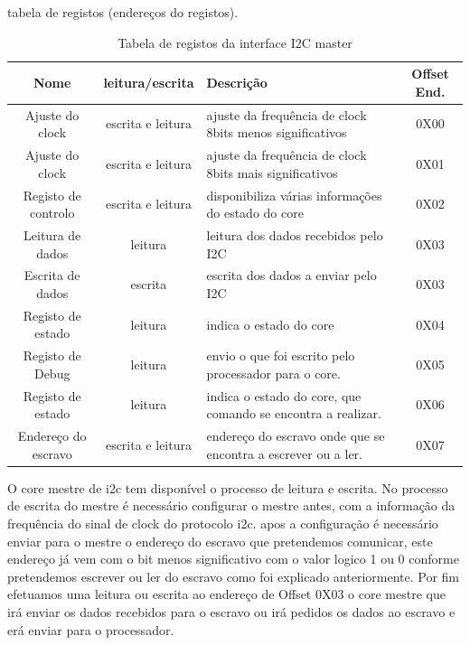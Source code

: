 tabela de registos (endere\c{c}os do registos).
\begin{table}[h!]
  \begin{center}
    \begin{tabular}{|c|c|C{8cm}|c|}
      \hline
      Nome & leitura/escrita & Descrição & Offset End. \\
      \hline \hline
      Ajuste do clock & escrita e leitura & ajuste da frequência de clock 8bits menos significativos  & 0X00 \\
      \hline
      Ajuste do clock & escrita e leitura & ajuste da frequência de clock 8bits mais significativos  & 0X01 \\
      \hline
      Registo de controlo & escrita e leitura & disponibiliza várias informações do estado do core & 0X02 \\
      \hline
      Leitura de dados & leitura & leitura dos dados recebidos pelo I2C & 0X03 \\
      \hline
      Escrita de dados & escrita & escrita dos dados a enviar pelo I2C & 0X03 \\
      \hline
      Registo de estado & leitura & indica o estado do core & 0X04 \\
      \hline
      Registo de Debug & leitura & envio o que foi escrito pelo processador para o core.& 0X05 \\
      \hline
      Registo de estado & leitura & indica o estado do core, que comando se encontra a realizar. & 0X06 \\
      \hline
      Endereço do escravo & escrita e leitura & endereço do escravo onde que se encontra a escrever ou a ler.  & 0X07 \\
      \hline
    \end{tabular}
  \end{center}
  \caption[Tabela de registo do core I2C master]{Tabela de registos da interface I2C master}
  \label{table:registos_I2C_master}
\end{table}

O core mestre de \acrshort{i2c} tem disponível o processo de leitura e escrita. No processo de escrita do mestre é necessário configurar o mestre antes, com a informação da frequência do sinal de clock do protocolo \acrshort{i2c}. apos a configuração é necessário enviar para o mestre o endereço do escravo que pretendemos comunicar, este endereço já vem com o bit menos significativo com o valor logico 1 ou 0 conforme pretendemos escrever ou ler do escravo como foi explicado anteriormente. Por fim efetuamos uma leitura ou escrita ao endereço de Offset 0X03 o core mestre que irá enviar os dados recebidos para o escravo ou irá pedidos os dados ao escravo e erá enviar para o processador.  


